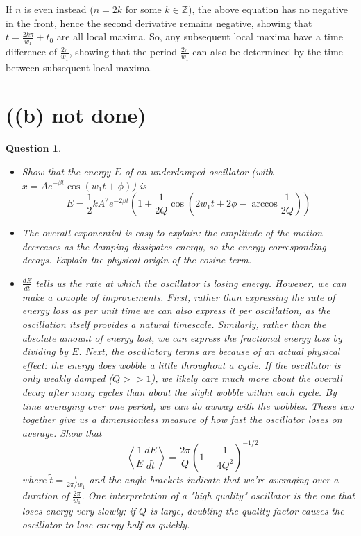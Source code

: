 \documentclass{article}
\newtheorem{question}{Question}
\newcommand{\ZZ}{\mathbb{Z}}
\begin{document}
If $n$ is even instead ($n=2k$ for some $k\in\ZZ$), the above equation has no negative in the front, hence the second derivative remains negative, showing that $t=\frac{2k \pi}{w_1}+t_0$ are all local maxima.
So, any subsequent local maxima have a time difference of $\frac{2\pi}{w_1}$, showing that the period $\frac{2\pi}{w_1}$ can also be determined by the time between subsequent local maxima.

\break

\section{((b) not done)}
\begin{question}\label{q2}
    
    \hfil

    \begin{itemize}
        \item[(a)] Show that the energy $E$ of an underdamped oscillator (with $x=Ae^{-\beta t}\cos(w_1 t+\phi)$) is 
        $$E=\frac{1}{2}kA^2e^{-2\beta t}\left(1+\frac{1}{2Q}\cos\left(2w_1 t+2\phi-\arccos\frac{1}{2Q}\right)\right)$$
        \item[(b)] The overall exponential is easy to explain: the amplitude of the motion decreases as the damping dissipates energy, so the energy corresponding decays. Explain the physical origin of the cosine term.
        \item[(c)] $\frac{dE}{dt}$ tells us the rate at which the oscillator is losing energy. However, we can make a couople of improvements. First, rather than expressing the rate of energy loss as \emph{per unit time} we can also express it \emph{per oscillation}, as the oscillation itself provides a natural timescale. Similarly, rather than the absolute amount of energy lost, we can express the fractional energy loss by dividing by $E$.
        Next, the oscillatory terms are because of an actual physical effect: the energy does wobble a little throughout a cycle. If the oscillator is only weakly damped ($Q>>1$), we likely care much more about the overall decay after many cycles than about the slight wobble within each cycle. By time averaging over one period, we can do awway with the wobbles. These two together give us a dimensionless measure of how fast the oscillator loses on average. Show that
        $$-\left<\frac{1}{E}\frac{dE}{d\tilde{t}}\right>=\frac{2\pi}{Q}\left(1-\frac{1}{4Q^2}\right)^{-1/2}$$
        where $\tilde{t}=\frac{t}{2\pi/w_1}$ and the angle brackets indicate that we're averaging over a duration of $\frac{2\pi}{w_1}$. One interpretation of a "high quality" oscillator is the one that loses energy very slowly; if $Q$ is large, doubling the quality factor causes the oscillator to lose energy half as quickly.
    \end{itemize}
\end{question}
\end{document}
